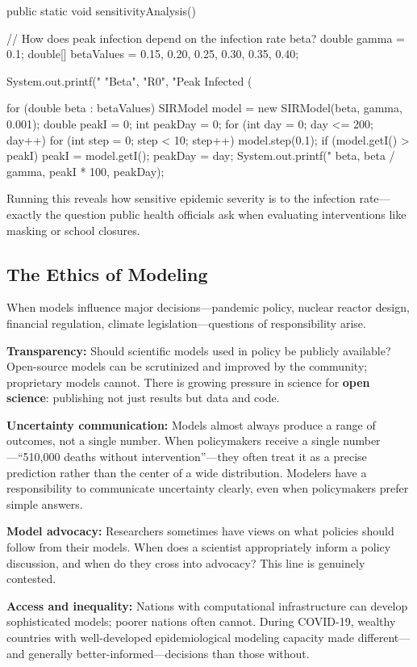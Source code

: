 \documentclass[11pt,letterpaper]{article}
\begin{document}
\begin{javacode}
public static void sensitivityAnalysis() {
    // How does peak infection depend on the infection rate beta?
    double gamma = 0.1;
    double[] betaValues = {0.15, 0.20, 0.25, 0.30, 0.35, 0.40};

    System.out.printf("%
                      "Beta", "R0", "Peak Infected (%

    for (double beta : betaValues) {
        SIRModel model = new SIRModel(beta, gamma, 0.001);
        double peakI = 0;
        int peakDay = 0;
        for (int day = 0; day <= 200; day++) {
            for (int step = 0; step < 10; step++) model.step(0.1);
            if (model.getI() > peakI) {
                peakI = model.getI();
                peakDay = day;
            }
        }
        System.out.printf("%
                          beta, beta / gamma, peakI * 100, peakDay);
    }
}
\end{javacode}

Running this reveals how sensitive epidemic severity is to the infection rate---exactly the question public health officials ask when evaluating interventions like masking or school closures.

\subsection{The Ethics of Modeling}

When models influence major decisions---pandemic policy, nuclear reactor design, financial regulation, climate legislation---questions of responsibility arise.

\begin{debatebox}
\textbf{Transparency:} Should scientific models used in policy be publicly available? Open-source models can be scrutinized and improved by the community; proprietary models cannot. There is growing pressure in science for \textbf{open science}: publishing not just results but data and code.

\textbf{Uncertainty communication:} Models almost always produce a range of outcomes, not a single number. When policymakers receive a single number---``510,000 deaths without intervention''---they often treat it as a precise prediction rather than the center of a wide distribution. Modelers have a responsibility to communicate uncertainty clearly, even when policymakers prefer simple answers.

\textbf{Model advocacy:} Researchers sometimes have views on what policies should follow from their models. When does a scientist appropriately inform a policy discussion, and when do they cross into advocacy? This line is genuinely contested.

\textbf{Access and inequality:} Nations with computational infrastructure can develop sophisticated models; poorer nations often cannot. During COVID-19, wealthy countries with well-developed epidemiological modeling capacity made different---and generally better-informed---decisions than those without.
\end{debatebox}
\end{document}
